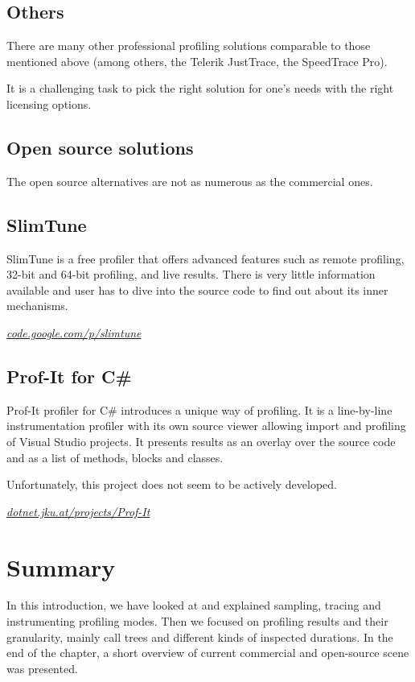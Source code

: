 \subsection{Others}
There are many other professional profiling solutions comparable to those mentioned above (among others, the Telerik JustTrace, the SpeedTrace Pro).

It is a challenging task to pick the right solution for one's needs with the right licensing options.

\subsection*{Open source solutions}
The open source alternatives are not as numerous as the commercial ones.

\subsection{SlimTune}
SlimTune is a free profiler that offers advanced features such as remote profiling, 32-bit and 64-bit profiling, and live results. There is very little information available and user has to dive into the source code to find out about its inner mechanisms.

\textit{\href{http://code.google.com/p/slimtune}{code.google.com/p/slimtune}}

\subsection{Prof-It for C\#}
Prof-It profiler for C\# introduces a unique way of profiling. It is a line-by-line instrumentation profiler with its own source viewer allowing import and profiling of Visual Studio projects. It presents results as an overlay over the source code and as a list of methods, blocks and classes. 

Unfortunately, this project does not seem to be actively developed. 

\textit{\href{http://dotnet.jku.at/projects/Prof-It/}{dotnet.jku.at/projects/Prof-It}}

\section*{Summary}
In this introduction, we have looked at and explained sampling, tracing and instrumenting profiling modes. Then we focused on profiling results and their granularity, mainly call trees and different kinds of inspected durations. In the end of the chapter, a short overview of current commercial and open-source scene was presented.

 

